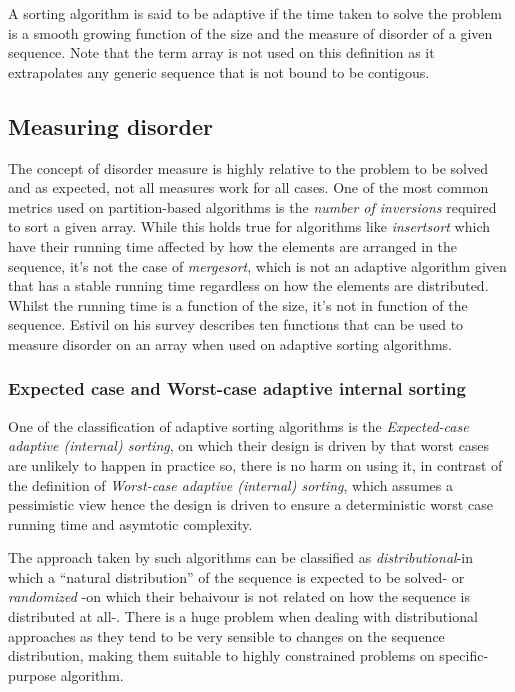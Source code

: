\documentclass{iccmemoria}
\begin{document}
A sorting algorithm is said to be adaptive if the time taken to solve the problem is a smooth growing function of the size and the measure of disorder of a given sequence. Note that the term array is not used on this definition as it extrapolates any generic sequence that is not bound to be contigous.

\subsection{Measuring disorder}
The concept of disorder measure is highly relative to the problem to be solved and as expected, not all measures work for all cases. One of the most common metrics used on partition-based algorithms is the \textit{number of inversions} required to sort a given array. While this holds true for algorithms like \textit{insertsort} which have their running time affected by how the elements are arranged in the sequence, it's not the case of \textit{mergesort}, which is not an adaptive algorithm given that has a stable running time regardless on how the elements are distributed. Whilst the running time is a function of the size, it's not in function of the sequence. Estivil \cite{estivil92} on his survey describes ten functions that can be used to measure disorder on an array when used on adaptive sorting algorithms.

\subsubsection{Expected case and Worst-case adaptive internal sorting}
One of the classification of adaptive sorting algorithms is the \textit{Expected-case adaptive (internal) sorting}, on which their design is driven by that worst cases are unlikely to happen in practice so, there is no harm on using it, in contrast of the definition of \textit{Worst-case adaptive (internal) sorting}, which assumes a pessimistic view hence the design is driven to ensure a deterministic worst case running time and asymtotic complexity.

The approach taken by such algorithms can be classified as \textit{distributional}-in which a ``natural distribution'' of the sequence is expected to be solved- or \textit{randomized} -on which their behaivour is not related on how the sequence is distributed at all-. There is a huge problem when dealing with distributional approaches as they tend to be very sensible to changes on the sequence distribution, making them suitable to highly constrained problems on specific-purpose algorithm.
\end{document}
